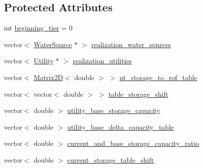 \subsection*{Protected Attributes}
\begin{DoxyCompactItemize}
\item 
int \mbox{\hyperlink{classContinuityModelROF_ad0a8c47eca4ca66b58a2636ab907a4f2_ad0a8c47eca4ca66b58a2636ab907a4f2}{beginning\+\_\+tier}} = 0
\item 
vector$<$ \mbox{\hyperlink{classWaterSource}{Water\+Source}} $\ast$ $>$ \mbox{\hyperlink{classContinuityModelROF_a77048d247b8d1f70fbdd31559b4d3337_a77048d247b8d1f70fbdd31559b4d3337}{realization\+\_\+water\+\_\+sources}}
\item 
vector$<$ \mbox{\hyperlink{classUtility}{Utility}} $\ast$ $>$ \mbox{\hyperlink{classContinuityModelROF_a75c6823d8dd37f274ee91ce158088dc4_a75c6823d8dd37f274ee91ce158088dc4}{realization\+\_\+utilities}}
\item 
vector$<$ \mbox{\hyperlink{classMatrix2D}{Matrix2D}}$<$ double $>$ $>$ \mbox{\hyperlink{classContinuityModelROF_ada25d241caf860255ad00097f5e7adb6_ada25d241caf860255ad00097f5e7adb6}{ut\+\_\+storage\+\_\+to\+\_\+rof\+\_\+table}}
\item 
vector$<$ vector$<$ double $>$ $>$ \mbox{\hyperlink{classContinuityModelROF_a1a90c8816944aab36f395e89f7b84c06_a1a90c8816944aab36f395e89f7b84c06}{table\+\_\+storage\+\_\+shift}}
\item 
vector$<$ double $>$ \mbox{\hyperlink{classContinuityModelROF_a6a429c37f019777325ea4e5b9ad26cae_a6a429c37f019777325ea4e5b9ad26cae}{utility\+\_\+base\+\_\+storage\+\_\+capacity}}
\item 
vector$<$ double $>$ \mbox{\hyperlink{classContinuityModelROF_a017041335a639ba56cc3e26dea07b514_a017041335a639ba56cc3e26dea07b514}{utility\+\_\+base\+\_\+delta\+\_\+capacity\+\_\+table}}
\item 
vector$<$ double $>$ \mbox{\hyperlink{classContinuityModelROF_adcaf978b52ba016474952a42856ba373_adcaf978b52ba016474952a42856ba373}{current\+\_\+and\+\_\+base\+\_\+storage\+\_\+capacity\+\_\+ratio}}
\item 
vector$<$ double $>$ \mbox{\hyperlink{classContinuityModelROF_a443efa8d5a8bcbb1fea1a0bc929c77cd_a443efa8d5a8bcbb1fea1a0bc929c77cd}{current\+\_\+storage\+\_\+table\+\_\+shift}}
\end{DoxyCompactItemize}
